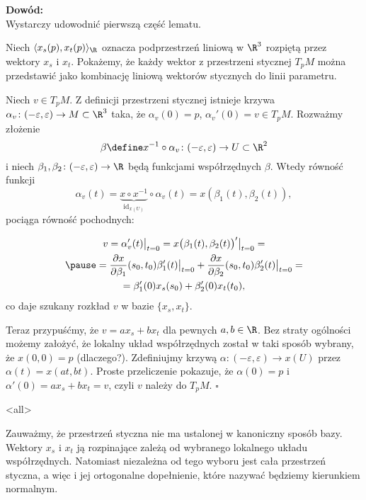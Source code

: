 \begin{frame}[<+->]

\textcolor{ared}{\textbf{Dowód:}}\\
\pause Wystarczy udowodnić pierwszą część lematu.

\pause Niech $\langle x_s(p),x_t(p)\rangle_\R$ oznacza podprzestrzeń liniową w $\R^3$ rozpiętą przez wektory $x_s$ i $x_t$. Pokażemy, że każdy wektor z przestrzeni stycznej $T_pM$ można przedstawić jako kombinację liniową wektorów stycznych do linii parametru.

\pause Niech $v\in T_pM$. Z definicji przestrzeni stycznej istnieje krzywa $\alpha_v\colon (-\varepsilon,\varepsilon)\to M\subset \R^3$ taka, że $\alpha_v(0)=p$, $\alpha_v'(0)=v\in T_pM$. \pause Rozważmy złożenie \[\beta\define x^{-1}\circ\alpha_v\colon (-\varepsilon,\varepsilon)\to U\subset \R^2\] i niech $\beta_1,\beta_2\colon (-\varepsilon,\varepsilon)\to \R$ będą funkcjami współrzędnych $\beta$. \pause Wtedy równość funkcji \[\alpha_v(t)=\underbrace{x\circ x^{-1}}_{\operatorname{id}_{x(U)}}\circ \alpha_v(t)=x(\beta_1(t),\beta_2(t)),\]pociąga równość pochodnych:
\end{frame}
\begin{frame}[<+->]

\begin{multline*}
v=\alpha_v'(t)\big|_{t=0}=x\big(\beta_1(t),\beta_2(t)\big)'\big|_{t=0}=\\\pause
=\frac{\partial x}{\partial \beta_1}(s_0,t_0)\beta_1'(t)\big|_{t=0}+\frac{\partial x}{\partial \beta_2}(s_0,t_0)\beta_2'(t)\big|_{t=0}=\\
=\beta_1'(0)x_s(s_0)+\beta_2'(0)x_t(t_0),
\end{multline*}
\pause co daje szukany rozkład $v$ w bazie $\{x_s, x_t\}$.

\pause Teraz przypuśćmy, że $v=ax_s+bx_t$ dla pewnych $a,b\in \R$. \pause Bez straty ogólności możemy założyć, że lokalny układ współrzędnych został w taki sposób wybrany, że $x(0,0)=p$ (dlaczego?). \pause Zdefiniujmy krzywą $\alpha\colon (-\varepsilon,\varepsilon)\to x(U)$ przez $\alpha(t)=x(at,bt)$. \pause Proste przeliczenie pokazuje, że $\alpha(0)=p$ i $\alpha'(0)=ax_s+bx_t=v$, czyli $v$ należy do $T_pM$.
\hfill $\square$

\end{frame}
\mode<all>{}
\begin{frame}[<+->]

\begin{uwaga}
Zauważmy, że przestrzeń styczna nie ma ustalonej w kanoniczny sposób bazy. Wektory $x_s$ i $x_t$ ją rozpinające zależą od wybranego lokalnego układu współrzędnych. Natomiast niezależna od tego wyboru jest cała przestrzeń styczna, a więc i jej ortogonalne dopełnienie, które nazywać będziemy kierunkiem normalnym.
\end{uwaga}

\end{frame}
